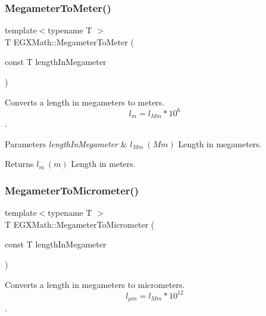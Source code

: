 \subsubsection{\texorpdfstring{Megameter\+To\+Meter()}{MegameterToMeter()}}
{\footnotesize\ttfamily template$<$typename T $>$ \\
T E\+G\+X\+Math\+::\+Megameter\+To\+Meter (\begin{DoxyParamCaption}\item[{const T}]{length\+In\+Megameter }\end{DoxyParamCaption})}



Converts a length in megameters to meters. \[ l_{m}=l_{Mm} * 10^{6}\]. 


\begin{DoxyParams}{Parameters}
{\em length\+In\+Megameter} & $ l_{Mm}\ (Mm)$ Length in megameters. \\
\hline
\end{DoxyParams}
\begin{DoxyReturn}{Returns}
$ l_{m}\ (m)$ Length in meters. 
\end{DoxyReturn}
\mbox{\label{group___e_g_x_math-_conversions-_length_conversions-_megameter-_s_i_ga4b0dc1e6dd503c23428038a69ff07146}} 
\subsubsection{\texorpdfstring{Megameter\+To\+Micrometer()}{MegameterToMicrometer()}}
{\footnotesize\ttfamily template$<$typename T $>$ \\
T E\+G\+X\+Math\+::\+Megameter\+To\+Micrometer (\begin{DoxyParamCaption}\item[{const T}]{length\+In\+Megameter }\end{DoxyParamCaption})}



Converts a length in megameters to micrometers. \[ l_{\mu m}=l_{Mm} * 10^{12} \]. 

